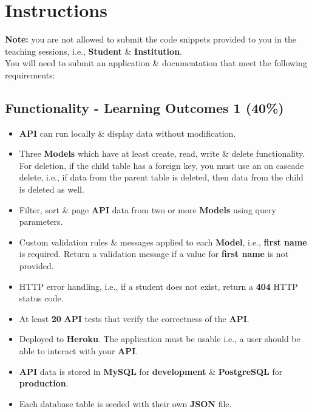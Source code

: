 \documentclass{article}
\begin{document}
\newpage

\section*{Instructions}
\textbf{Note:} you are not allowed to submit the code snippets provided to you in the teaching sessions, i.e., \textbf{Student} \& \textbf{Institution}. \\

You will need to submit an application \& documentation that meet the following requirements:

\subsection*{Functionality - Learning Outcomes 1 (40\%)}
\begin{itemize}
	\item \textbf{API} can run locally \& display data without modification.
	\item Three \textbf{Models} which have at least create, read, write \& delete functionality. For deletion, if the child table has a foreign key, you must use an on cascade delete, i.e., if data from the parent table is deleted, then data from the child is deleted as well.
	\item Filter, sort \& page \textbf{API} data from two or more \textbf{Models} using query parameters.
	\item Custom validation rules \& messages applied to each \textbf{Model}, i.e., \textbf{first name} is required. Return a validation message if a value for \textbf{first name} is not provided.
	\item HTTP error handling, i.e., if a student does not exist, return a \textbf{404} HTTP status code.
	\item At least \textbf{20} \textbf{API} tests that verify the correctness of the \textbf{API}.
	\item Deployed to \textbf{Heroku}. The application must be usable i.e., a user should be able to interact with your \textbf{API}.
	\item \textbf{API} data is stored in \textbf{MySQL} for \textbf{development} \& \textbf{PostgreSQL} for \textbf{production}.
	\item Each database table is seeded with their own \textbf{JSON} file.
\end{itemize}
\end{document}
